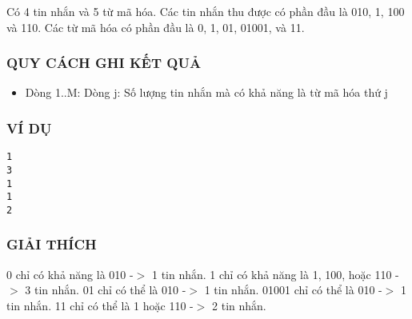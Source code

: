    Có 4 tin nhắn và 5 từ mã hóa. Các tin nhắn thu được có phần đầu là 010, 1, 100 và 110. Các từ mã hóa có phần đầu là 0, 1, 01, 01001, và 11.  

\subsubsection{   QUY CÁCH GHI KẾT QUẢ  }
\begin{itemize}
	\item     Dòng 1..M: Dòng j: Số lượng tin nhắn mà có khả năng là từ mã hóa thứ j   
\end{itemize}

\subsubsection{   VÍ DỤ  }
\begin{verbatim}
1
3
1
1
2
\end{verbatim}

\subsubsection{   GIẢI THÍCH  }

   0 chỉ có khả năng là 010 -$>$ 1 tin nhắn. 1 chỉ có khả năng là 1, 100, hoặc 110 -$>$ 3 tin nhắn. 01 chỉ có thể là 010 -$>$ 1 tin nhắn. 01001 chỉ có thể là 010 -$>$ 1 tin nhắn. 11 chỉ có thể là 1 hoặc 110 -$>$ 2 tin nhắn.  